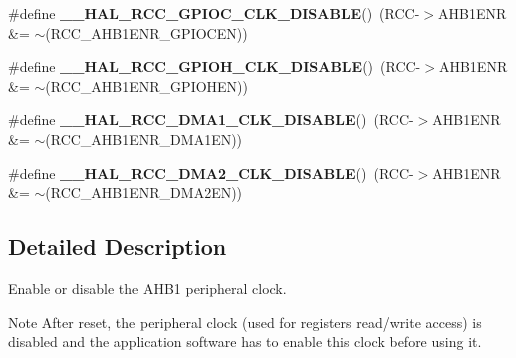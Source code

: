 \begin{DoxyCompactItemize}
\item 
\#define {\bfseries \+\_\+\+\_\+\+H\+A\+L\+\_\+\+R\+C\+C\+\_\+\+G\+P\+I\+O\+C\+\_\+\+C\+L\+K\+\_\+\+D\+I\+S\+A\+B\+LE}()~(R\+CC-\/$>$A\+H\+B1\+E\+NR \&= $\sim$(R\+C\+C\+\_\+\+A\+H\+B1\+E\+N\+R\+\_\+\+G\+P\+I\+O\+C\+EN))\hypertarget{group___r_c_c___a_h_b1___clock___enable___disable_ga0fc90c25d35f9b5b5f66961505de1cd4}{}\label{group___r_c_c___a_h_b1___clock___enable___disable_ga0fc90c25d35f9b5b5f66961505de1cd4}

\item 
\#define {\bfseries \+\_\+\+\_\+\+H\+A\+L\+\_\+\+R\+C\+C\+\_\+\+G\+P\+I\+O\+H\+\_\+\+C\+L\+K\+\_\+\+D\+I\+S\+A\+B\+LE}()~(R\+CC-\/$>$A\+H\+B1\+E\+NR \&= $\sim$(R\+C\+C\+\_\+\+A\+H\+B1\+E\+N\+R\+\_\+\+G\+P\+I\+O\+H\+EN))\hypertarget{group___r_c_c___a_h_b1___clock___enable___disable_ga1eb7dd0a520cef518fb624bf7117b7e1}{}\label{group___r_c_c___a_h_b1___clock___enable___disable_ga1eb7dd0a520cef518fb624bf7117b7e1}

\item 
\#define {\bfseries \+\_\+\+\_\+\+H\+A\+L\+\_\+\+R\+C\+C\+\_\+\+D\+M\+A1\+\_\+\+C\+L\+K\+\_\+\+D\+I\+S\+A\+B\+LE}()~(R\+CC-\/$>$A\+H\+B1\+E\+NR \&= $\sim$(R\+C\+C\+\_\+\+A\+H\+B1\+E\+N\+R\+\_\+\+D\+M\+A1\+EN))\hypertarget{group___r_c_c___a_h_b1___clock___enable___disable_ga569dc8b9e178a8afab2664fdf87f46c5}{}\label{group___r_c_c___a_h_b1___clock___enable___disable_ga569dc8b9e178a8afab2664fdf87f46c5}

\item 
\#define {\bfseries \+\_\+\+\_\+\+H\+A\+L\+\_\+\+R\+C\+C\+\_\+\+D\+M\+A2\+\_\+\+C\+L\+K\+\_\+\+D\+I\+S\+A\+B\+LE}()~(R\+CC-\/$>$A\+H\+B1\+E\+NR \&= $\sim$(R\+C\+C\+\_\+\+A\+H\+B1\+E\+N\+R\+\_\+\+D\+M\+A2\+EN))\hypertarget{group___r_c_c___a_h_b1___clock___enable___disable_gaa97383d7ee14e9a638eb8c9ba35658f0}{}\label{group___r_c_c___a_h_b1___clock___enable___disable_gaa97383d7ee14e9a638eb8c9ba35658f0}

\end{DoxyCompactItemize}


\subsection{Detailed Description}
Enable or disable the A\+H\+B1 peripheral clock. 

\begin{DoxyNote}{Note}
After reset, the peripheral clock (used for registers read/write access) is disabled and the application software has to enable this clock before using it. 
\end{DoxyNote}


